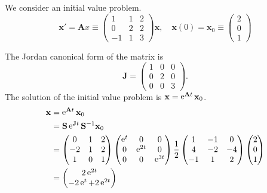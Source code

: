 {\begin{Solution}
  \label{solution x'=(112022-113)x}
  We consider an initial value problem.
  \[
  \mathbf{x}' = \mathbf{A} x \equiv
  \begin{pmatrix}
    1 & 1 & 2 \\
    0 & 2 & 2 \\
    -1 & 1 & 3
  \end{pmatrix} 
  \mathbf{x}, \quad 
  \mathbf{x}(0) = \mathbf{x}_0 \equiv
  \begin{pmatrix}
    2 \\
    0 \\
    1
  \end{pmatrix}
  \]

  The Jordan canonical form of the matrix is
  \[
  \mathbf{J} =
  \begin{pmatrix}
    1 & 0 & 0 \\
    0 & 2 & 0 \\
    0 & 0 & 3
  \end{pmatrix}.
  \]
  The solution of the initial value problem is $\mathbf{x} = \mathop{\mathrm{e}}\nolimits^{\mathbf{A} t} \mathbf{x}_0$.
  \begin{align*}
    \mathbf{x} &= \mathop{\mathrm{e}}\nolimits^{\mathbf{A} t} \mathbf{x}_0 \\
    &= \mathbf{S} \mathop{\mathrm{e}}\nolimits^{\mathbf{J} t} \mathbf{S}^{-1} \mathbf{x}_0 \\
    &= \begin{pmatrix} 0 & 1 & 2 \\ 
      -2 & 1 & 2 \\ 
      1 & 0 & 1 \end{pmatrix}
    \begin{pmatrix} \mathop{\mathrm{e}}\nolimits^{t} & 0 & 0 \\ 
      0 & \mathop{\mathrm{e}}\nolimits^{2 t} & 0 \\ 
      0 & 0 & \mathop{\mathrm{e}}\nolimits^{3 t} \end{pmatrix}
    \frac{1}{2} \begin{pmatrix} 1 & -1 & 0 \\
      4 & -2 & -4 \\
      -1 & 1 & 2 \end{pmatrix}
    \begin{pmatrix} 2 \\ 0 \\ 1 \end{pmatrix} \\
    &= \begin{pmatrix} 2 \mathop{\mathrm{e}}\nolimits^{2 t} \\
      - 2 \mathop{\mathrm{e}}\nolimits^t + 2 \mathop{\mathrm{e}}\nolimits^{2 t} \\

\end{pmatrix}
\end{align*}
\end{Solution}}
